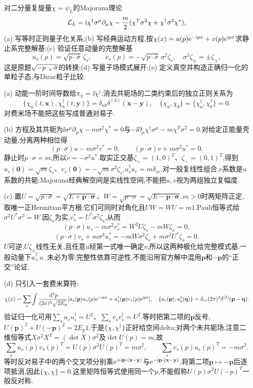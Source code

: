 \begin{exercise}
对二分量复旋量$\chi=\psi_L$的Majorana理论
\[
 \mathcal L_L=\mathrm i\chi^\dagger\sigma^\mu\partial_\mu\chi
 -\frac m2(\chi^T\sigma^2\chi+\chi^\dagger\sigma^2\chi^*),
\]
(a) 写等时正则量子化关系;(b) 写经典运动方程,按$\chi(x)=u(p)\mathrm e^{-\mathrm i px}+v(p)\mathrm e^{\mathrm i px}$求静止系完整解基;(c) 验证任意动量的完整解基
\[
 u_s(p)=\sqrt{p\cdot\bar\sigma}\,\zeta_s,\qquad
 v_s(p)=-\sqrt{p\cdot\bar\sigma}\,\sigma^2\zeta_s,
 \quad\sigma^3\zeta_\pm=\pm\zeta_\pm,
\]
这是原题$\sqrt{-p\cdot_{\rm o}\bar\sigma}$的转换;(d) 写量子场模式展开;(e) 定义真空并构造正确归一化的单粒子态,与Dirac粒子比较.
\end{exercise}
\begin{solution}
(a) 动能一阶时间导数给$\pi_\chi=\ii\chi^\dagger$;消去共轭场的二类约束后的独立正则关系为
\[
 \{\chi_a(t,\mathbf x),\chi_b^\dagger(t,\mathbf y)\}=\delta_{ab}\delta^{(3)}(\mathbf x-\mathbf y),
 \quad\{\chi_a,\chi_b\}=\{\chi_a^\dagger,\chi_b^\dagger\}=0.
\]
对费米场不能把这些写成普通对易子.

(b) 方程及其共轭为$\ii\sigma^\mu\partial_\mu\chi-m\sigma^2\chi^*=0$与$-\ii\partial_\mu\chi^\dagger\sigma^\mu-m\chi^T\sigma^2=0$.对给定正能量壳动量,分离两种相位得
\[
 (p\cdot\sigma)u-m\sigma^2v^*=0,\qquad
 (p\cdot\sigma)v+m\sigma^2u^*=0.
\]
静止时$p\cdot\sigma=m$,所以$v=-\sigma^2u^*$.取实正交基$\zeta_+=(1,0)^T$、$\zeta_-=(0,1)^T$,得到$u_s(\mathbf0)=\sqrt m\zeta_s$、$v_s(\mathbf0)=-\sqrt m\sigma^2\zeta_s$,$u_s^\dagger u_r=m\delta_{sr}$.对一般复线性组合,$v$系数是$u$系数的共轭:Majorana经典解空间是实线性空间,不能把$u,v$视为两组独立复幅度.

(c) 置$U=\sqrt{p\cdot\bar\sigma}=\sqrt{E+\mathbf p\cdot\boldsymbol\sigma}$、$W=\sqrt{p\cdot\sigma}=\sqrt{E-\mathbf p\cdot\boldsymbol\sigma}$.$m>0$时两矩阵正定,取唯一正Hermitian平方根;它们可同时对角化且$UW=WU=m1$.Pauli恒等式给$\sigma^2U^*\sigma^2=W$.因$\zeta_s$为实,$v_s^*=U^*\sigma^2\zeta_s$,从而
\[
 (p\cdot\sigma)u_s-m\sigma^2v_s^*
 =W^2U\zeta_s-mW\zeta_s=0,
\]
\[
 (p\cdot\sigma)v_s+m\sigma^2u_s^*
 =-mW\sigma^2\zeta_s+m\sigma^2U^*\zeta_s=0.
\]
$U$可逆,$U\zeta_\pm$线性无关,且任意$u$经第一式唯一确定$v$,所以这两种极化给完整模式基.一般动量下$u_+^\dagger u_-$未必为零;完整性依靠可逆性,不能沿用官方解中混用$\mathbf p$和$-\mathbf p$的“正交”论证.

(d) 只引入一套费米算符:
\[
 \chi(x)=\sum_s\int\frac{\,\mathrm d^3p}{(2\pi)^3\sqrt{2E_p}}
 [a_s(\mathbf p)u_s(p)\mathrm e^{-\mathrm i px}+a_s^\dagger(\mathbf p)v_s(p)\mathrm e^{\mathrm i px}],
 \quad\{a_r(\mathbf p),a_s^\dagger(\mathbf q)\}=\delta_{rs}(2\pi)^3\delta^{(3)}(\mathbf p-\mathbf q).
\]
验证归一化可用$\sum_su_su_s^\dagger=U^2$、$\sum_sv_sv_s^\dagger=U^2$.等时把第二项的$\mathbf p$反号,$U(\mathbf p)^2+U(-\mathbf p)^2=2E_p1$,于是$\{\chi,\chi^\dagger\}$正好给空间delta;对两个未共轭场,注意二维恒等式$X\sigma^2X^T=(\det X)\sigma^2$及$\det U(p)=m$,故
\[
 \sum_su_s(p)v_s(p)^T=U(p)\sigma^2U(p)^T=m\sigma^2,\qquad
 \sum_sv_s(p)u_s(p)^T=-m\sigma^2.
\]
等时反对易子中的两个交叉项分别乘$\mathrm e^{+\mathrm i\mathbf p\cdot(\mathbf x-\mathbf y)}$与$\mathrm e^{-\mathrm i\mathbf p\cdot(\mathbf x-\mathbf y)}$;将第二项$\mathbf p\mapsto-\mathbf p$后逐项抵消,因此$\{\chi,\chi\}=0$.这里矩阵恒等式使用同一个$p$,不能假称$U(p)\sigma^2U(-p)^T$一般反对称.


\end{solution}
